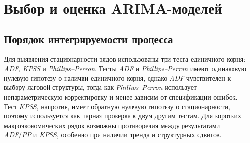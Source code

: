 \documentclass[12pt,a4paper]{article}
\begin{document}
\section{Выбор и оценка ARIMA-моделей}

\subsection{Порядок интегрируемости процесса}

Для выявления стационарности рядов использованы три теста единичного корня: \textit{ADF}, \textit{KPSS} и \textit{Phillips--Perron}. Тесты \textit{ADF} и \textit{Phillips--Perron} имеют одинаковую нулевую гипотезу о наличии единичного корня, однако \textit{ADF} чувствителен к выбору лаговой структуры, тогда как \textit{Phillips--Perron} использует непараметрическую корректировку и менее зависим от спецификации ошибок. Тест \textit{KPSS}, напротив, имеет обратную нулевую гипотезу о стационарности, поэтому используется как парная проверка к двум другим тестам. Для коротких макроэкономических рядов возможны противоречия между результатами \textit{ADF}/\textit{PP} и \textit{KPSS}, особенно при наличии тренда и структурных сдвигов.
\end{document}
